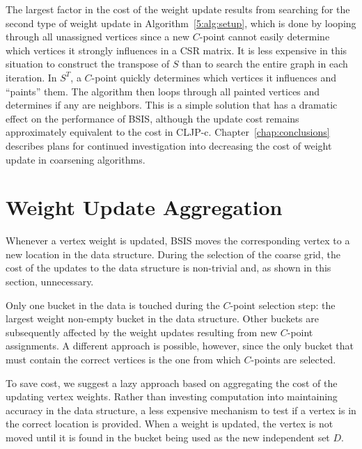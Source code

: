 \documentclass{elsart}
\begin{document}
The largest factor in the cost of the weight update results from
searching for the second type of weight update in
Algorithm~\ref{5:alg:setup}, which is done by looping through all
unassigned vertices since a new $C$-point cannot easily determine
which vertices it strongly influences in a CSR matrix. It is less
expensive in this situation to construct the transpose of $S$ than to
search the entire graph in each iteration. In $S^T$, a $C$-point
quickly determines which vertices it influences and ``paints''
them. The algorithm then loops through all painted vertices and
determines if any are neighbors. This is a simple solution that has a
dramatic effect on the performance of BSIS, although the update cost
remains approximately equivalent to the cost in
CLJP-c. Chapter~\ref{chap:conclusions} describes plans for continued
investigation into decreasing the cost of weight update in coarsening
algorithms.

\section{Weight Update Aggregation}
\label{5:sec:agg}
Whenever a vertex weight is updated, BSIS moves the corresponding
vertex to a new location in the data structure. During the selection
of the coarse grid, the cost of the updates to the data structure is
non-trivial and, as shown in this section, unnecessary.

Only one bucket in the data is touched during the $C$-point selection
step: the largest weight non-empty bucket in the data structure. Other
buckets are subsequently affected by the weight updates resulting from
new $C$-point assignments. A different approach is possible, however,
since the only bucket that must contain the correct vertices is the
one from which $C$-points are selected.

To save cost, we suggest a lazy approach based on aggregating the cost
of the updating vertex weights. Rather than investing computation into
maintaining accuracy in the data structure, a less expensive mechanism
to test if a vertex is in the correct location is provided. When a
weight is updated, the vertex is not moved until it is found in the
bucket being used as the new independent set $D$.
\end{document}
